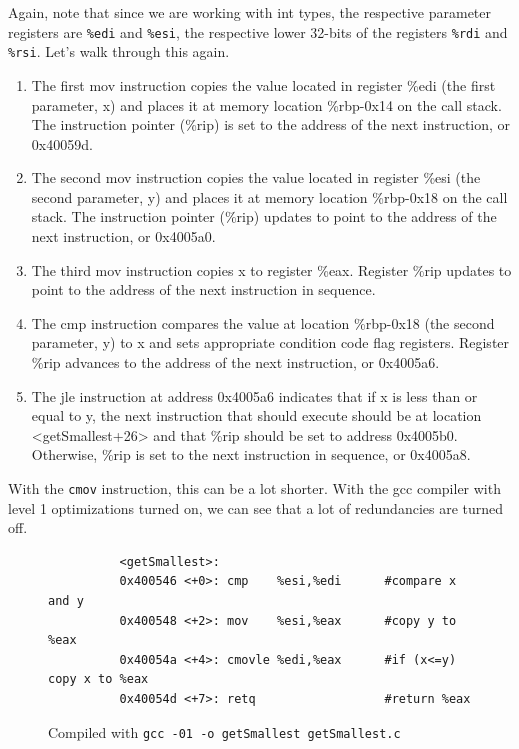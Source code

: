 \documentclass{article}
\begin{document}
      Again, note that since we are working with int types, the respective parameter registers are \texttt{\%edi} and \texttt{\%esi}, the respective lower 32-bits of the registers \texttt{\%rdi} and \texttt{\%rsi}. Let's walk through this again. 
      \begin{enumerate}
        \item The first mov instruction copies the value located in register \%edi (the first parameter, x) and places it at memory location \%rbp-0x14 on the call stack. The instruction pointer (\%rip) is set to the address of the next instruction, or 0x40059d.
        \item The second mov instruction copies the value located in register \%esi (the second parameter, y) and places it at memory location \%rbp-0x18 on the call stack. The instruction pointer (\%rip) updates to point to the address of the next instruction, or 0x4005a0.
        \item The third mov instruction copies x to register \%eax. Register \%rip updates to point to the address of the next instruction in sequence.
        \item The cmp instruction compares the value at location \%rbp-0x18 (the second parameter, y) to x and sets appropriate condition code flag registers. Register \%rip advances to the address of the next instruction, or 0x4005a6.
        \item The jle instruction at address 0x4005a6 indicates that if x is less than or equal to y, the next instruction that should execute should be at location <getSmallest+26> and that \%rip should be set to address 0x4005b0. Otherwise, \%rip is set to the next instruction in sequence, or 0x4005a8.
      \end{enumerate}

      With the \texttt{cmov} instruction, this can be a lot shorter. With the gcc compiler with level 1 optimizations turned on, we can see that a lot of redundancies are turned off. 

      \begin{figure}[H]
        \centering 
        \begin{lstlisting}
          <getSmallest>:
          0x400546 <+0>: cmp    %esi,%edi      #compare x and y
          0x400548 <+2>: mov    %esi,%eax      #copy y to %eax
          0x40054a <+4>: cmovle %edi,%eax      #if (x<=y) copy x to %eax
          0x40054d <+7>: retq                  #return %eax
        \end{lstlisting}
        \caption{Compiled with \texttt{gcc -01 -o getSmallest getSmallest.c} } 
        \label{fig:if_statement_optimized}
      \end{figure}
\end{document}
